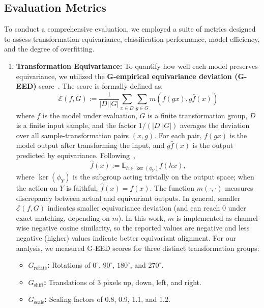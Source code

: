\documentclass[conference]{IEEEtran}
\begin{document}
\subsection{Evaluation Metrics}\label{subsec:metrics}
To conduct a comprehensive evaluation, we employed a suite of metrics designed to assess transformation equivariance, classification performance, model efficiency, and the degree of overfitting.

\begin{enumerate}
    \item \textbf{Transformation Equivariance:} To quantify how well each model preserves equivariance, we utilized the \textbf{G-empirical equivariance deviation (G-EED)} score~\cite{kvinge2022}. The score is formally defined as:
    \begin{equation}
        \mathcal{E}(f,G):=\frac{1}{|D||G|}\sum_{x\in D}\sum_{g\in G}m(f(gx),g\hat{f}(x))
        \label{eq:geed}
    \end{equation}
    where $f$ is the model under evaluation, $G$ is a finite transformation group, $D$ is a finite input sample, and the factor $1/(|D||G|)$ averages the deviation over all sample-transformation pairs $(x,g)$. For each pair, $f(gx)$ is the model output after transforming the input, and $g\hat{f}(x)$ is the output predicted by equivariance. Following~\cite{kvinge2022},
    \begin{equation}
        \hat{f}(x):=\mathbb{E}_{h\in\ker(\phi_Y)}f(hx),
        \label{eq:fhat}
    \end{equation}
    where $\ker(\phi_Y)$ is the subgroup acting trivially on the output space; when the action on $Y$ is faithful, $\hat{f}(x)=f(x)$. The function $m(\cdot,\cdot)$ measures discrepancy between actual and equivariant outputs. In general, smaller $\mathcal{E}(f,G)$ indicates smaller equivariance deviation (and can reach 0 under exact matching, depending on $m$). In this work, $m$ is implemented as channel-wise negative cosine similarity, so the reported values are negative and less negative (higher) values indicate better equivariant alignment. For our analysis, we measured G-EED scores for three distinct transformation groups:
    \begin{itemize}
        \item \textbf{\(G_{\text{rotate}}\):} Rotations of $0^{\circ}$, $90^{\circ}$, $180^{\circ}$, and $270^{\circ}$.
        \item \textbf{\(G_{\text{shift}}\):} Translations of 3 pixels up, down, left, and right.
        \item \textbf{\(G_{\text{scale}}\):} Scaling factors of 0.8, 0.9, 1.1, and 1.2.
    \end{itemize}



\end{enumerate}
\end{document}
